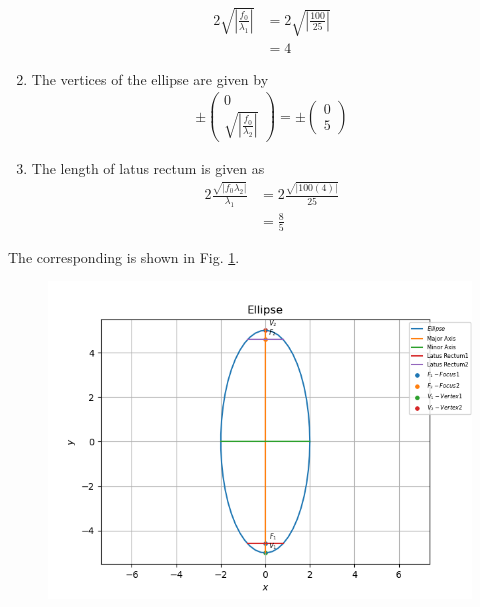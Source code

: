 \documentclass[12pt]{article}
\providecommand{\brak}[1]{\ensuremath{\left(#1\right)}}
\providecommand{\abs}[1]{\left\vert#1\right\vert}
\newcommand{\myvec}[1]{\ensuremath{\begin{pmatrix}#1\end{pmatrix}}}
\begin{document}
\begin{enumerate}
\begin{align}
	2\sqrt{\abs{\frac{f_0}{\lambda_1}}}&= 2\sqrt{\abs{\frac{100}{25}}}\\
	&= 4
\end{align}
\item The vertices of the ellipse are given by
\begin{align}
	\pm \myvec{0\\\sqrt{\abs{\frac{f_0}{\lambda_2}}}}= \pm \myvec{0\\5}
\end{align}
\item The length of latus rectum is given as
\begin{align}
	2\frac{\sqrt{\abs{f_0 \lambda_2}}}{\lambda_1} &= 2\frac{\sqrt{\abs{100\brak{4}}}}{25}\\
	&= \frac{8}{5}
\end{align}
\end{enumerate}
The corresponding is shown in Fig. \ref{fig:chapters/11/11/3/2/Fig1}.
\begin{figure}[!h]
	\begin{center} 
	    \includegraphics[width=\columnwidth]{chapters/11/11/3/2/figs/ellipse}
	\end{center}
\caption{}
\label{fig:chapters/11/11/3/2/Fig1}
\end{figure}
\end{document}
